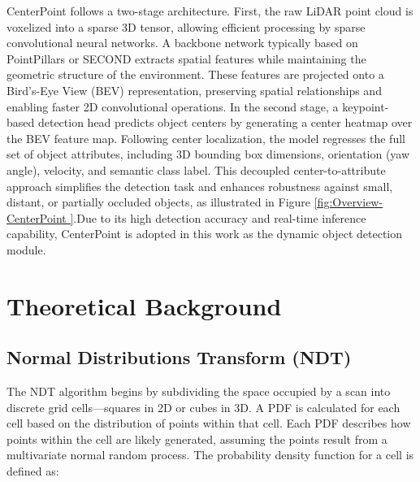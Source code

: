 CenterPoint follows a two-stage architecture\cite{yin2021center}. First, the raw LiDAR point cloud is voxelized into a sparse 3D tensor, allowing efficient processing by sparse convolutional neural networks. A backbone network typically based on PointPillars \cite{lang2019pointpillars} or SECOND\cite{yan2018second} extracts spatial features while maintaining the geometric structure of the environment. These features are projected onto a Bird’s-Eye View (BEV) representation, preserving spatial relationships and enabling faster 2D convolutional operations. In the second stage, a keypoint-based detection head predicts object centers by generating a center heatmap over the BEV feature map. Following center localization, the model regresses the full set of object attributes, including 3D bounding box dimensions, orientation (yaw angle), velocity, and semantic class label. This decoupled center-to-attribute approach simplifies the detection task and enhances robustness against small, distant, or partially occluded objects, as illustrated in Figure \ref{fig:Overview-CenterPoint }.Due to its high detection accuracy and real-time inference capability, CenterPoint is adopted in this work as the dynamic object detection module.



\section{Theoretical Background }

\subsection{Normal Distributions Transform (NDT)}

The NDT algorithm begins by subdividing the space occupied by a scan into discrete grid cells---squares in 2D or cubes in 3D. A PDF is calculated for each cell based on the distribution of points within that cell. Each PDF describes how points within the cell are likely generated, assuming the points result from a multivariate normal random process. The probability density function for a cell is defined as:

